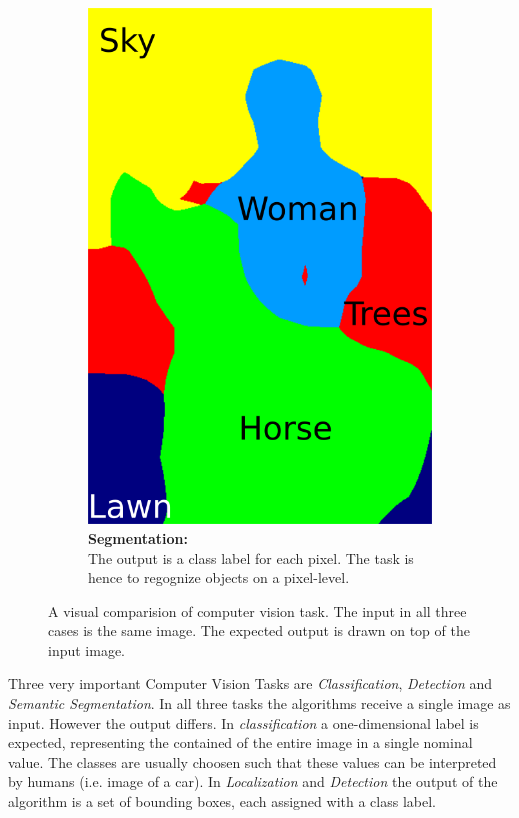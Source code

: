 \begin{figure}
\begin{subfigure}[t]{0.32\columnwidth}
        \includegraphics[width=\columnwidth]{figures/horse_seg.png}
        \caption{ \textbf{Segmentation:} \\
		The output is a class label for each pixel. The task is hence to regognize objects on a pixel-level.}
        \label{fig:sfig3}
    \end{subfigure}
    \caption{A visual comparision of computer vision task. The input in all three cases is the same image. The expected output is drawn on top of the input image.}
    \label{fig:cvtasks}
\end{figure}



Three very important Computer Vision Tasks are \emph{Classification}, \emph{Detection} and \emph{Semantic Segmentation}. In all three tasks the algorithms receive a single image as input. However the output differs. In \emph{classification} a one-dimensional label is expected, representing the contained of the entire image in a single nominal value. The classes are usually choosen such that these values can be interpreted by humans (i.e. image of a car). In \emph{Localization} and \emph{Detection} the output of the algorithm is a set of bounding boxes, each assigned with a class label. 

